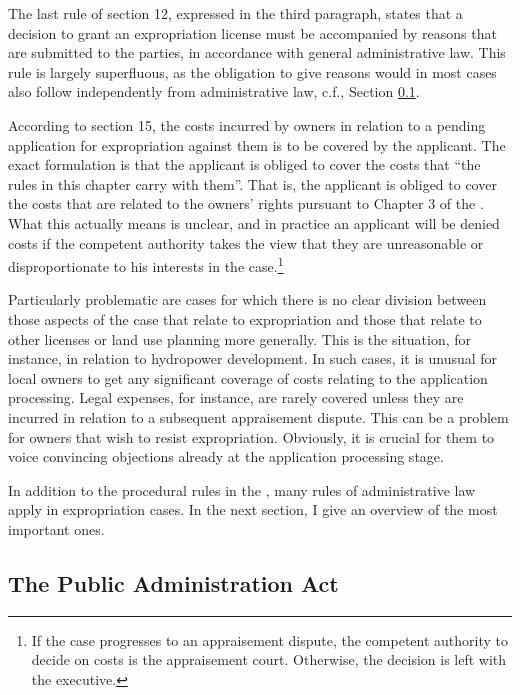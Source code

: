 The last rule of section 12, expressed in the third paragraph, states that a decision to grant an expropriation license must be accompanied by reasons that are submitted to the parties, in accordance with general administrative law. This rule is largely superfluous, as the obligation to give reasons would in most cases also follow independently from administrative law, c.f., Section \ref{sec:paa67}.

According to section 15, the costs incurred by owners in relation to a pending application for expropriation against them is to be covered by the applicant. The exact formulation is that the applicant is obliged to cover the costs that ``the rules in this chapter carry with them''. That is, the applicant is obliged to cover the costs that are related to the owners' rights pursuant to Chapter 3 of the \cite{ea59}. What this actually means is unclear, and in practice an applicant will be denied costs if the competent authority takes the view that they are unreasonable or disproportionate to his interests in the case.\footnote{If the case progresses to an appraisement dispute, the competent authority to decide on costs is the appraisement court. Otherwise, the decision is left with the executive.}

Particularly problematic are cases for which there is no clear division between those aspects of the case that relate to expropriation and those that relate to other licenses or land use planning more generally. This is the situation, for instance, in relation to hydropower development. In such cases, it is unusual for local owners to get any significant coverage of costs relating to the application processing. Legal expenses, for instance, are rarely covered unless they are incurred in relation to a subsequent appraisement dispute. This can be a problem for owners that wish to resist expropriation. Obviously, it is crucial for them to voice convincing objections already at the application processing stage.

In addition to the procedural rules in the \cite{ea59}, many rules of administrative law apply in expropriation cases. In the next section, I give an overview of the most important ones.

\subsection{The Public Administration Act}\label{sec:paa67}


